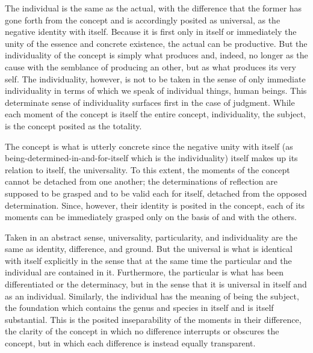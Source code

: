 The individual is the same as the actual,
with the difference that the former has
gone forth from the concept
and is accordingly posited as universal,
as the negative identity with itself.
Because it is first only in itself
or immediately the unity of
the essence and concrete existence,
the actual can be productive.
But the individuality of the concept is
simply what produces and, indeed,
no longer as the cause with
the semblance of producing an other,
but as what produces its very self.
The individuality, however, is
not to be taken in the sense of
only immediate individuality in terms of which
we speak of individual things, human beings.
This determinate sense of individuality
surfaces first in the case of judgment.
While each moment of the concept is
itself the entire concept,
individuality, the subject, is
the concept posited as the totality.

The concept is what is utterly concrete
since the negative unity with itself
(as being-determined-in-and-for-itself which is the individuality)
itself makes up its relation to itself, the universality.
To this extent, the moments of the concept
cannot be detached from one another;
the determinations of reflection are supposed to be grasped
and to be valid each for itself,
detached from the opposed determination.
Since, however, their identity is posited in the concept,
each of its moments can be immediately grasped only
on the basis of and with the others.

Taken in an abstract sense, universality, particularity, and individuality
are the same as identity, difference, and ground.
But the universal is what is identical with itself explicitly
in the sense that at the same time the particular and the individual
are contained in it.
Furthermore, the particular is what has been differentiated or the determinacy,
but in the sense that it is universal in itself and as an individual.
Similarly, the individual has the meaning of being the subject,
the foundation which contains the genus and species in itself
and is itself substantial.
This is the posited inseparability of the moments
in their difference, the clarity of the concept in which
no difference interrupts or obscures the concept,
but in which each difference is instead equally transparent.

